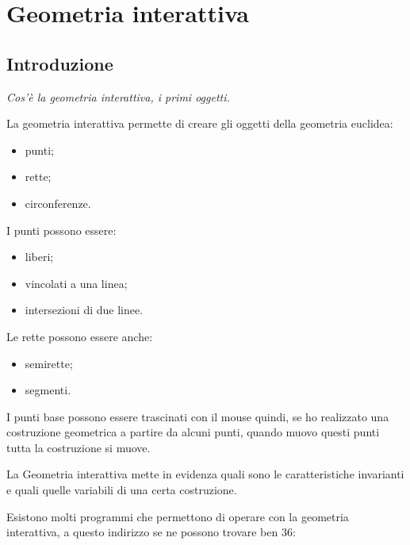 

%

\chapter{Geometria interattiva}

\section{Introduzione}
\label{sec:introduzione}

\emph{Cos'è la geometria interattiva, i primi oggetti.}

La geometria interattiva permette di creare gli oggetti della geometria
euclidea:
\begin{itemize} [noitemsep]
\item punti;
\item rette;
\item circonferenze.
\end{itemize}

I punti possono essere:

\begin{itemize} [noitemsep]
\item liberi;
\item vincolati a una linea;
\item intersezioni di due linee.
\end{itemize}

Le rette possono essere anche:
\begin{itemize} [noitemsep]
\item semirette;
\item segmenti.
\end{itemize}

I punti base possono essere trascinati con il mouse quindi, se ho realizzato
una costruzione geometrica a partire da alcuni punti, quando muovo questi
punti tutta la costruzione si muove.

La Geometria interattiva mette in evidenza quali sono le caratteristiche
invarianti e quali quelle variabili di una certa costruzione.

Esistono molti programmi che permettono di operare con la geometria
interattiva, a questo indirizzo se ne possono trovare ben 36:

